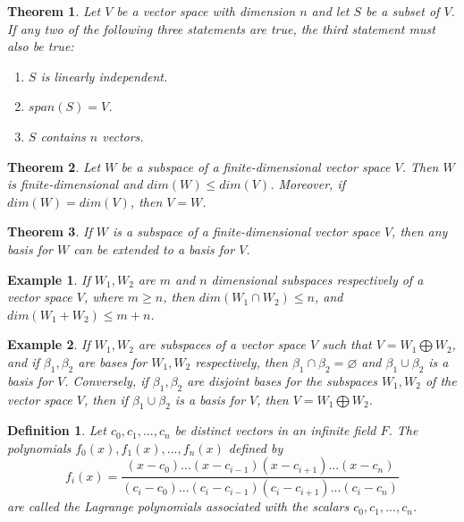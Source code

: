\documentclass[a4paper]{article}
\newtheorem{mytheorem}{Theorem}
\newtheorem{example}{Example}
\newtheorem{mydef}{Definition}
\numberwithin{mytheorem}{section}
\numberwithin{mydef}{section}
\numberwithin{example}{section}
\begin{document}
\begin{mytheorem} Let $V$ be a vector space with dimension $n$ and let $S$ be a subset of $V$. If any two of the following three statements are true, the third statement must also be true:
\begin{enumerate}
\item $S$ is linearly independent.
\item $span(S) = V$.
\item $S$ contains $n$ vectors.
\end{enumerate}
\end{mytheorem}


\begin{mytheorem} Let $W$ be a subspace of a finite-dimensional vector space $V$. Then $W$ is finite-dimensional and $dim(W) \leq dim(V)$. Moreover, if $dim(W) = dim(V)$, then $V = W$.
\end{mytheorem}

\begin{mytheorem} If $W$ is a subspace of a finite-dimensional vector space $V$, then any basis for $W$ can be extended to a basis for $V$.
\end{mytheorem}

\begin{example} If $W_{1},W_{2}$ are $m$ and $n$ dimensional subspaces respectively of a vector space $V$, where $m \geq n$, then $dim(W_{1} \cap W_{2}) \leq n$, and $dim(W_{1} + W_{2}) \leq m + n$.
\end{example}

\begin{example} If $W_{1},W_{2}$ are subspaces of a vector space $V$ such that $V = W_{1} \bigoplus W_{2}$, and if $\beta_{1},\beta_{2}$ are bases for $W_{1},W_{2}$ respectively, then $\beta_{1} \cap \beta_{2} = \varnothing$ and $\beta_{1} \cup \beta_{2}$ is a basis for $V$. Conversely, if $\beta_{1},\beta_{2}$ are disjoint bases for the subspaces $W_{1},W_{2}$ of the vector space $V$, then if $\beta_{1} \cup \beta_{2}$ is a basis for $V$, then $V = W_{1} \bigoplus W_{2}$.
\end{example}


\begin{mydef} Let $c_{0},c_{1},...,c_{n}$ be distinct vectors in an infinite field $F$. The polynomials $f_{0}(x),f_{1}(x),...,f_{n}(x)$ defined by $$f_{i}(x) = \frac{(x-c_{0})...(x-c_{i-1})(x-c_{i+1})...(x-c_{n})}{(c_{i}-c_{0})...(c_{i}-c_{i-1})(c_{i}-c_{i+1})...(c_{i}-c_{n})}$$ are called the Lagrange polynomials associated with the scalars $c_{0},c_{1},...,c_{n}$.
\end{mydef}
\end{document}
